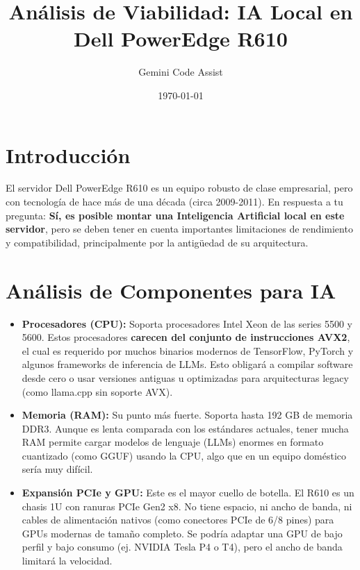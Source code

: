 \documentclass[12pt,a4paper]{article}
\title{Análisis de Viabilidad: IA Local en Dell PowerEdge R610}
\author{Gemini Code Assist}
\date{\today}
\begin{document}
\maketitle

\section{Introducción}
El servidor Dell PowerEdge R610 es un equipo robusto de clase empresarial, pero con tecnología de hace más de una década (circa 2009-2011). En respuesta a tu pregunta: \textbf{Sí, es posible montar una Inteligencia Artificial local en este servidor}, pero se deben tener en cuenta importantes limitaciones de rendimiento y compatibilidad, principalmente por la antigüedad de su arquitectura.

\section{Análisis de Componentes para IA}
\begin{itemize}
    \item \textbf{Procesadores (CPU):} Soporta procesadores Intel Xeon de las series 5500 y 5600. Estos procesadores \textbf{carecen del conjunto de instrucciones AVX2}, el cual es requerido por muchos binarios modernos de TensorFlow, PyTorch y algunos frameworks de inferencia de LLMs. Esto obligará a compilar software desde cero o usar versiones antiguas u optimizadas para arquitecturas legacy (como llama.cpp sin soporte AVX).
    \item \textbf{Memoria (RAM):} Su punto más fuerte. Soporta hasta 192 GB de memoria DDR3. Aunque es lenta comparada con los estándares actuales, tener mucha RAM permite cargar modelos de lenguaje (LLMs) enormes en formato cuantizado (como GGUF) usando la CPU, algo que en un equipo doméstico sería muy difícil.
    \item \textbf{Expansión PCIe y GPU:} Este es el mayor cuello de botella. El R610 es un chasis 1U con ranuras PCIe Gen2 x8. No tiene espacio, ni ancho de banda, ni cables de alimentación nativos (como conectores PCIe de 6/8 pines) para GPUs modernas de tamaño completo. Se podría adaptar una GPU de bajo perfil y bajo consumo (ej. NVIDIA Tesla P4 o T4), pero el ancho de banda limitará la velocidad.
\end{itemize}
\end{document}
